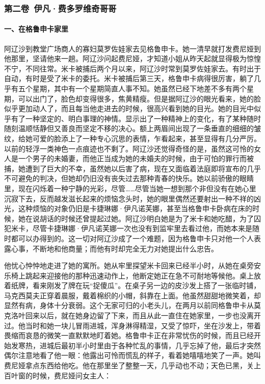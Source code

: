 \subsubsection*{第二卷\ 伊凡·费多罗维奇哥哥}

\paragraph*{一、在格鲁申卡家里}
\par 阿辽沙到教堂广场商人的寡妇莫罗佐娃家去见格鲁申卡。她一清早就打发费尼娅到他那里，坚请他来一趟。阿辽沙问起费尼娅，才知道小姐从昨天起就显得极为惊惶不宁，不同往常。米卡被捕后两个月以来，阿辽沙时常到莫罗佐娃家去。有时出于自动，有时是受了米卡的委托。米卡被捕后第三天，格鲁申卡病得很厉害，躺了几乎有五个星期，其中有一个星期简直人事不知。她虽然已经下地差不多有两个星期，可以出门了，脸色却变得很多，焦黄精瘦。但是据阿辽沙的眼光看来，她的脸似乎更加动人了，而且每当他走进去的时候，很高兴看到她的目光。她的目光中似乎有了一种坚定的、明白事理的神情。显示出了一种精神上的变化，有了某种随时随刻温顺恬静但又善良而坚定不移的决心。额上两眉间出现了一条垂直的细细的皱纹，给她可爱的脸添上了一种专心沉思的表情，乍看起来，甚至显得有几分严厉。以前的轻浮一类神色一点痕迹也不剩了。阿辽沙还觉得奇怪的是，虽然这可怜的女人是一个男子的未婚妻，而他正当成为她的未婚夫的时候，由于可怕的罪行而被捕，她遭到了巨大的不幸，虽然她以后害了病，现在又面临着法庭即将宣布的几乎不可避免的判决，但她却仍旧没有丧失过去那种青春的快乐。她以前骄傲的眼睛里，现在闪烁着一种宁静的光彩，尽管……尽管当她一想到那个非但没有在她心里沉寂下去，反而越发滋长起来的烦恼念头时，她的眼里偶然还要射出一种不祥的凶光，这种烦恼的对象仍旧是卡捷琳娜·伊凡诺芙娜，甚至当格鲁申卡卧病在床的时候，她在说胡话的时候还曾提起过她。阿辽沙明白她是为了米卡和她吃醋，为了囚犯米卡，尽管卡捷琳娜·伊凡诺芙娜一次也没有到监牢里去看过他，而她本来是随时都可以办得到的。这一切对阿辽沙成了一个难题，因为格鲁申卡只对他一个人表露心事，不断地和他商量；而他有时却完全无力对她提出什么忠告。
\par 他忧心忡忡地走进了她的寓所。她从牢里探望米卡回来已经半小时，从她在桌旁安乐椅上跳起来迎接他的那种迅速动作上，他断定她正在急不可耐地等候他。桌上放着纸牌，看来刚发了牌在玩“捉傻瓜”。在桌子另一边的皮沙发上搭了一张临时铺，马克西莫夫正穿着晨服，戴着棉织的小帽，斜靠在上面。他虽然甜甜地微笑着，却显然有病，身体十分衰弱。这个无家可归的小老头儿，在两月以前同格鲁申卡从莫克洛叶回来以后，就在她身边留了下来，而且从此一直住在她家里，一步也没离开过。他当时和她一块儿冒雨进城，浑身淋得精湿，又受了惊吓，坐在沙发上，带着畏缩而哀恳的微笑一直默默地盯着她。格鲁申卡正在非常忧伤的时候，而且已经开始发寒热，进城后最初半小时里由于各种忙乱的事情，几乎忘掉了他，最后才突然偶尔注意地看了他一眼：他露出可怜而慌乱的样子，看着她嘻嘻地笑了一声。她叫费尼娅拿点东西给他吃。他在那里坐了整整一天，几乎动也不动；天色已黑，关上百叶窗的时候，费尼娅问女主人：
